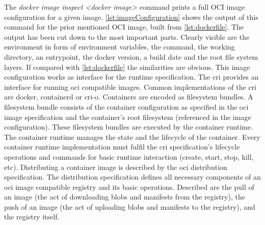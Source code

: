 \documentclass[titlepage]{report}
\begin{document}
The \emph{docker image inspect <docker image>} command prints a full OCI image configuration for a given image. \autoref{lst:imageConfiguration} shows the output of this command
for the prior mentioned OCI image, built from \autoref{lst:dockerfile}. The output has been cut down to the most important parts. Clearly visible are the environment in form of environment
variables, the command, the working directory, an entrypoint, the docker version, a build date and the root file system layers. If compared with \autoref{lst:dockerfile} the similarities are obvious. 
This image configuration works as interface for the runtime specification. The \gls{cri} provides an interface for running \gls{oci} compatible images. Common implementations of the \gls{cri} are
docker, containerd\cite{Containerd} or cri-o\cite{CRIO}. Containers are encoded as filesystem bundles. A filesystem bundle consists of the container configuration as specified in the \gls{oci} image specification
and the container's root filesystem (referenced in the image configuration)\cite{FilesystemBundle}. These filesystem bundles are executed by the container runtime. The container runtime manages the state and the lifecycle
of the container. Every container runtime implementation must fulfil the \gls{cri} specification's lifecycle operations and commands for basic runtime interaction (create, start, stop, kill, etc).
Distributing a container image is described by the \gls{oci} distribution specification. The distribution specification defines all necessary components of an \gls{oci} image compatible registry
and its basic operations. Described are the pull of an image (the act of downloading \glspl{blob} and manifests from the registry), the push of an image (the act of uploading \glspl{blob} and manifests to the registry),
and the registry itself. 
\end{document}
